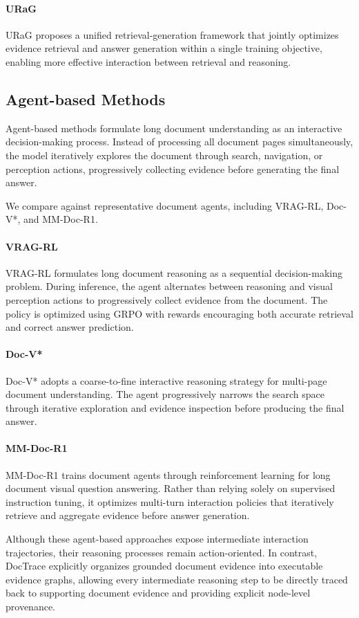 \documentclass[letterpaper]{article} %
\begin{document}
\paragraph{URaG}

URaG proposes a unified retrieval-generation framework that jointly optimizes evidence retrieval and answer generation within a single training objective, enabling more effective interaction between retrieval and reasoning.




\subsection{Agent-based Methods}

Agent-based methods formulate long document understanding as an interactive decision-making process. Instead of processing all document pages simultaneously, the model iteratively explores the document through search, navigation, or perception actions, progressively collecting evidence before generating the final answer.

We compare against representative document agents, including VRAG-RL, Doc-V*, and MM-Doc-R1.

\paragraph{VRAG-RL}

VRAG-RL formulates long document reasoning as a sequential decision-making problem. During inference, the agent alternates between reasoning and visual perception actions to progressively collect evidence from the document. The policy is optimized using GRPO with rewards encouraging both accurate retrieval and correct answer prediction.

\paragraph{Doc-V*}

Doc-V* adopts a coarse-to-fine interactive reasoning strategy for multi-page document understanding. The agent progressively narrows the search space through iterative exploration and evidence inspection before producing the final answer.

\paragraph{MM-Doc-R1}

MM-Doc-R1 trains document agents through reinforcement learning for long document visual question answering. Rather than relying solely on supervised instruction tuning, it optimizes multi-turn interaction policies that iteratively retrieve and aggregate evidence before answer generation.

Although these agent-based approaches expose intermediate interaction trajectories, their reasoning processes remain action-oriented. In contrast, DocTrace explicitly organizes grounded document evidence into executable evidence graphs, allowing every intermediate reasoning step to be directly traced back to supporting document evidence and providing explicit node-level provenance.
\end{document}
